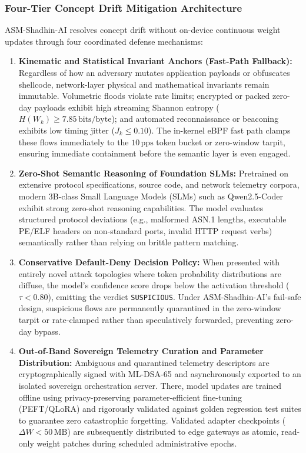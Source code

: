 \documentclass[journal]{IEEEtran}
\renewcommand{\_}{\textunderscore\allowbreak}
\begin{document}
\subsubsection{Four-Tier Concept Drift Mitigation Architecture}
ASM-Shadhin-AI resolves concept drift without on-device continuous weight updates through four coordinated defense mechanisms:
\begin{enumerate}
  \item \textbf{Kinematic and Statistical Invariant Anchors (Fast-Path Fallback):} Regardless of how an adversary mutates application payloads or obfuscates shellcode, network-layer physical and mathematical invariants remain immutable. Volumetric floods violate rate limits; encrypted or packed zero-day payloads exhibit high streaming Shannon entropy ($H(W_k) \ge 7.85\,\text{bits/byte}$); and automated reconnaissance or beaconing exhibits low timing jitter ($J_k \le 0.10$). The in-kernel eBPF fast path clamps these flows immediately to the $10\,\text{pps}$ token bucket or zero-window tarpit, ensuring immediate containment before the semantic layer is even engaged.
  \item \textbf{Zero-Shot Semantic Reasoning of Foundation SLMs:} Pretrained on extensive protocol specifications, source code, and network telemetry corpora, modern 3B-class Small Language Models (SLMs) such as Qwen2.5-Coder exhibit strong zero-shot reasoning capabilities. The model evaluates structured protocol deviations (e.g., malformed ASN.1 lengths, executable PE/ELF headers on non-standard ports, invalid HTTP request verbs) semantically rather than relying on brittle pattern matching.
  \item \textbf{Conservative Default-Deny Decision Policy:} When presented with entirely novel attack topologies where token probability distributions are diffuse, the model's confidence score drops below the activation threshold ($\tau < 0.80$), emitting the verdict \texttt{SUSPICIOUS}. Under ASM-Shadhin-AI's fail-safe design, suspicious flows are permanently quarantined in the zero-window tarpit or rate-clamped rather than speculatively forwarded, preventing zero-day bypass.
  \item \textbf{Out-of-Band Sovereign Telemetry Curation and Parameter Distribution:} Ambiguous and quarantined telemetry descriptors are cryptographically signed with ML-DSA-65 and asynchronously exported to an isolated sovereign orchestration server. There, model updates are trained offline using privacy-preserving parameter-efficient fine-tuning (PEFT/QLoRA) and rigorously validated against golden regression test suites to guarantee zero catastrophic forgetting. Validated adapter checkpoints ($\Delta W < 50\,\text{MB}$) are subsequently distributed to edge gateways as atomic, read-only weight patches during scheduled administrative epochs.
\end{enumerate}
\end{document}
